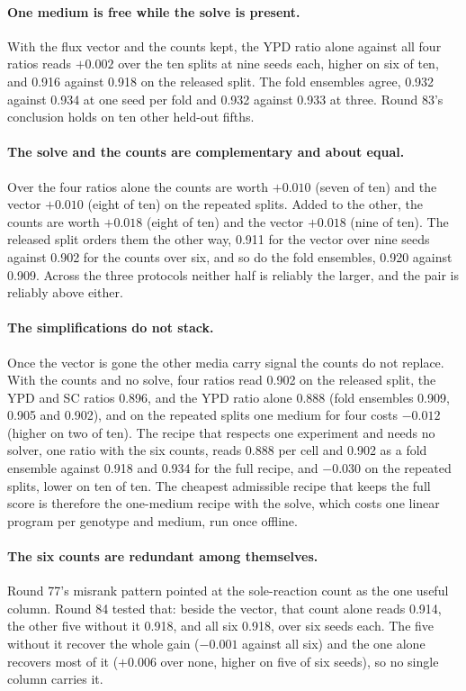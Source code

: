 \paragraph{One medium is free while the solve is present.} With the flux vector and the
counts kept, the YPD ratio alone against all four ratios reads $+0.002$ over the ten
splits at nine seeds each, higher on six of ten, and 0.916 against 0.918 on the released
split. The fold ensembles agree, 0.932 against 0.934 at one seed per fold and 0.932
against 0.933 at three. Round 83's conclusion holds on ten other held-out fifths.

\paragraph{The solve and the counts are complementary and about equal.} Over the four
ratios alone the counts are worth $+0.010$ (seven of ten) and the vector $+0.010$ (eight
of ten) on the repeated splits. Added to the other, the counts are worth $+0.018$ (eight
of ten) and the vector $+0.018$ (nine of ten). The released split orders them the other way,
0.911 for the vector over nine seeds against 0.902 for the counts over six, and so do the fold
ensembles, 0.920 against 0.909. Across the three protocols neither half is reliably the
larger, and the pair is reliably above either.

\paragraph{The simplifications do not stack.} Once the vector is gone the other media
carry signal the counts do not replace. With the counts and no solve, four ratios read
0.902 on the released split, the YPD and SC ratios 0.896, and the YPD ratio alone 0.888
(fold ensembles 0.909, 0.905 and 0.902),
and on the repeated splits one medium for four costs $-0.012$ (higher on two of ten). The recipe that respects one experiment and needs no solver,
one ratio with the six counts, reads 0.888 per cell and 0.902 as a fold ensemble against
0.918 and 0.934 for the full recipe, and $-0.030$ on the repeated splits, lower on ten of
ten. The cheapest admissible recipe that keeps the full score is therefore the
one-medium recipe with the solve, which costs one linear program per genotype and medium,
run once offline.

\paragraph{The six counts are redundant among themselves.} Round 77's misrank pattern
pointed at the sole-reaction count as the one useful column. Round 84 tested that: beside the vector, that count alone
reads 0.914, the other five without it 0.918, and all six 0.918, over six seeds each. The
five without it recover the whole gain ($-0.001$ against all six) and the one alone
recovers most of it ($+0.006$ over none, higher on five of six seeds), so no single
column carries it.

